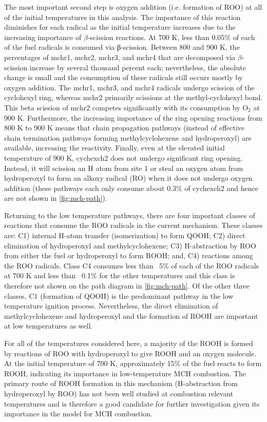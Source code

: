 \documentclass[12pt, letterpaper]{article}
\begin{document}
The most important second step is oxygen addition (i.e. formation of ROO) at
all of the initial temperatures in this analysis. The importance of this
reaction diminishes for each radical as the initial temperature increases due
to the increasing importance of $\beta$-scission reactions. At 700 K, less than
0.05\% of each of the fuel radicals is consumed via β-scission. Between 800 and
900 K, the percentages of mchr1, mchr2, mchr3, and mchr4 that are decomposed
via $\beta$-scission increase by several thousand percent each; nevertheless,
the absolute change is small and the consumption of these radicals still occurs
mostly by oxygen addition. The mchr1, mchr3, and mchr4 radicals undergo
scission of the cyclohexyl ring, whereas mchr2 primarily scissions at the
methyl-cyclohexyl bond. This beta scission of mchr2 competes significantly with
its consumption by O$_2$ at 900 K. Furthermore, the increasing importance of the
ring opening reactions from 800 K to 900 K means that chain propagation pathways
(instead of effective chain termination pathways forming methylcyclohexene and
hydroperoxyl) are available, increasing the reactivity. Finally, even at the
elevated initial temperature of 900 K, cychexch2 does not undergo significant
ring opening. Instead, it will scission an H atom from site 1 or steal an oxygen
atom from hydroperoxyl to form an alkoxy radical (RO) when it does not undergo
oxygen addition (these pathways each only consume about 0.3\% of cychexch2 and
hence are not shown in \autoref{fig:mch-path}).

Returning to the low temperature pathways, there are four important classes of
reactions that consume the ROO radicals in the current mechanism. These classes
are: C1) internal H-atom transfer (isomerization) to form QOOH; C2) direct
elimination of hydroperoxyl and methylcyclohexene; C3) H-abstraction by ROO
from either the fuel or hydroperoxyl to form ROOH; and, C4) reactions among the
ROO radicals. Class C4 consumes less than ~5\% of each of the ROO radicals at
700 K and less than ~0.1\% for the other temperatures and this class is
therefore not shown on the path diagram in \autoref{fig:mch-path}. Of the other
three classes, C1 (formation of QOOH) is the predominant pathway in the low
temperature ignition process. Nevertheless, the direct elimination of
methylcyclohexene and hydroperoxyl and the formation of ROOH are important at
low temperatures as well.

For all of the temperatures considered here, a majority of the ROOH is formed
by reactions of ROO with hydroperoxyl to give ROOH and an oxygen molecule. At
the initial temperature of 700 K, approximately 15\% of the fuel reacts to form
ROOH, indicating its importance in low-temperature MCH combustion. The primary
route of ROOH formation in this mechanism (H-abstraction from hydroperoxyl by
ROO) has not been well studied at combustion relevant temperatures
\cite{Zador2011} and is therefore a good candidate for further investigation
given its importance in the model for MCH combustion.
\end{document}
